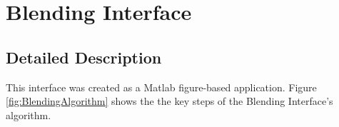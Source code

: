 \documentclass[11pt, oneside]{report}   	%
\begin{document}

\pagebreak
\section{Blending Interface}
\subsection{Detailed Description}\label{sec:BlendingDescription}
This interface was created as a Matlab figure-based application. Figure \ref{fig:BlendingAlgorithm} shows the the key steps of the Blending Interface's algorithm.
\end{document}
